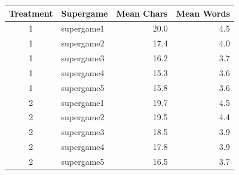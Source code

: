\begin{tabular}{clrr}
  \toprule
  Treatment & Supergame & Mean Chars & Mean Words \\ 
  \midrule
  1 & supergame1 & 20.0 & 4.5 \\ 
  1 & supergame2 & 17.4 & 4.0 \\ 
  1 & supergame3 & 16.2 & 3.7 \\ 
  1 & supergame4 & 15.3 & 3.6 \\ 
  1 & supergame5 & 15.8 & 3.6 \\ 
  2 & supergame1 & 19.7 & 4.5 \\ 
  2 & supergame2 & 19.5 & 4.4 \\ 
  2 & supergame3 & 18.5 & 3.9 \\ 
  2 & supergame4 & 17.8 & 3.9 \\ 
  2 & supergame5 & 16.5 & 3.7 \\ 
  \bottomrule
\end{tabular}
